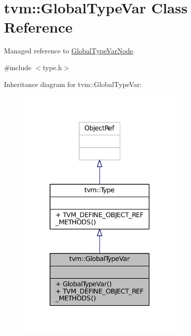 \hypertarget{classtvm_1_1GlobalTypeVar}{}\section{tvm\+:\+:Global\+Type\+Var Class Reference}
\label{classtvm_1_1GlobalTypeVar}


Managed reference to \hyperlink{classtvm_1_1GlobalTypeVarNode}{Global\+Type\+Var\+Node}.  




{\ttfamily \#include $<$type.\+h$>$}



Inheritance diagram for tvm\+:\+:Global\+Type\+Var\+:
\nopagebreak
\begin{figure}[H]
\begin{center}
\leavevmode
\includegraphics[width=230pt]{classtvm_1_1GlobalTypeVar__inherit__graph}
\end{center}
\end{figure}


